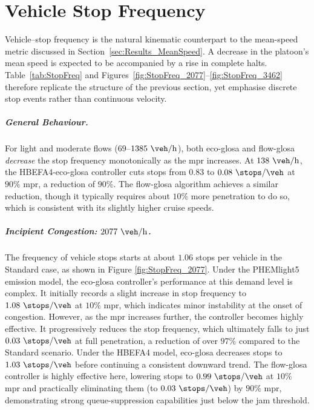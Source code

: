 \section{Vehicle Stop Frequency}
\label{sec:Results_Stops}

Vehicle–stop frequency is the natural kinematic counterpart to the mean-speed metric discussed in Section~\vref{sec:Results_MeanSpeed}. A decrease in the platoon’s mean speed is expected to be accompanied by a rise in complete halts. Table~\vref{tab:StopFreq} and Figures~\vref{fig:StopFreq_2077}–\vref{fig:StopFreq_3462} therefore replicate the structure of the previous section, yet emphasise discrete stop events rather than continuous velocity.

\subparagraph*{General Behaviour.}

For light and moderate flows ($69$--$1385~\unit{\veh\per\hour}$), both \ac{eco-glosa} and \ac{flow-glosa} \emph{decrease} the stop frequency monotonically as the \ac{mpr} increases. At $138~\unit{\veh\per\hour}$, the HBEFA4-\ac{eco-glosa} controller cuts stops from $0.83$ to $0.08~\unit{\stops\per\veh}$ at $90\%$ \ac{mpr}, a reduction of $90\%$. The \ac{flow-glosa} algorithm achieves a similar reduction, though it typically requires about $10\%$ more penetration to do so, which is consistent with its slightly higher cruise speeds.

\subparagraph*{Incipient Congestion: $2077~\unit{\veh\per\hour}$.}
The frequency of vehicle stops starts at about $1.06$ stops per vehicle in the Standard case, as shown in Figure \vref{fig:StopFreq_2077}. Under the PHEMlight5 emission model, the \ac{eco-glosa} controller's performance at this demand level is complex. It initially records a slight increase in stop frequency to $1.08~\unit{\stops\per\veh}$ at $10\%$ \ac{mpr}, which indicates minor instability at the onset of congestion. However, as the \ac{mpr} increases further, the controller becomes highly effective. It progressively reduces the stop frequency, which ultimately falls to just $0.03~\unit{\stops\per\veh}$ at full penetration, a reduction of over $97\%$ compared to the Standard scenario. Under the HBEFA4 model, \ac{eco-glosa} decreases stops to $1.03~\unit{\stops\per\veh}$ before continuing a consistent downward trend. The \ac{flow-glosa} controller is highly effective here, lowering stops to $0.99~\unit{\stops\per\veh}$ at $10\%$ \ac{mpr} and practically eliminating them (to $0.03~\unit{\stops\per\veh}$) by $90\%$ \ac{mpr}, demonstrating strong queue-suppression capabilities just below the jam threshold.

